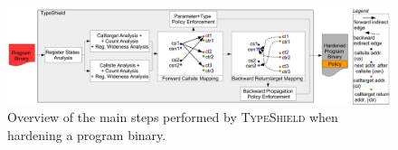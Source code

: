 \begin{center}
\begin{figure}[t!]
\centering
   \includegraphics[width=.88\textwidth]{figures/overview.pdf}
    \caption{Overview of the main steps performed by \textsc{TypeShield} when hardening a program binary.}
    \label{System overview.}
    \vspace{-.5cm}
 \end{figure}
\end{center}